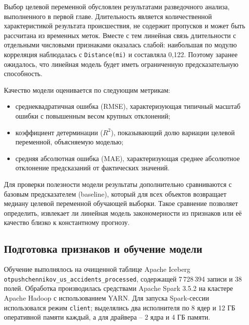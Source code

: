 Выбор целевой переменной обусловлен результатами разведочного анализа, выполненного в первой главе. Длительность является количественной характеристикой результата происшествия, не содержит пропусков и может быть рассчитана из временных меток. Вместе с тем линейная связь длительности с отдельными числовыми признаками оказалась слабой: наибольшая по модулю корреляция наблюдалась с \texttt{Distance(mi)} и составляла 0,122. Поэтому заранее ожидалось, что линейная модель будет иметь ограниченную предсказательную способность.

Качество модели оценивается по следующим метрикам:
\begin{itemize}
    \item среднеквадратичная ошибка (RMSE), характеризующая типичный масштаб ошибки с повышенным весом крупных отклонений;
    \item коэффициент детерминации ($R^2$), показывающий долю вариации целевой переменной, объясняемую моделью;
    \item средняя абсолютная ошибка (MAE), характеризующая среднее абсолютное отклонение предсказаний от фактических значений.
\end{itemize}

Для проверки полезности модели результаты дополнительно сравниваются с базовым предсказателем (baseline), который для всех объектов возвращает медиану целевой переменной обучающей выборки. Такое сравнение позволяет определить, извлекает ли линейная модель закономерности из признаков или её качество близко к константному прогнозу.

\vspace{\baselineskip}\subsection{Подготовка признаков и обучение модели}\vspace{\baselineskip}

Обучение выполнялось на очищенной таблице Apache Iceberg \texttt{otpushchennikov\_us\_accidents\_processed}, содержащей 7\,728\,394 записи и 38 полей. Обработка производилась средствами Apache Spark 3.5.2 на кластере Apache Hadoop с использованием YARN. Для запуска Spark-сессии использовался режим \texttt{client}; выделялись два исполнителя по 8 ядер и 12 ГБ оперативной памяти каждый, а для драйвера -- 2 ядра и 4 ГБ памяти.

